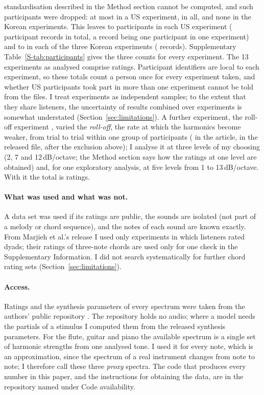 \documentclass[11pt,a4paper]{article}
\begin{document}
standardisation described in the Method section cannot be computed, and such participants
were dropped: at most \nDropUSMax{} in a US experiment, \nDropUSTotal{} in all, and none in
the Korean experiments. This leaves \nUSPerExpMin{} to \nUSPerExpMax{} participants in each
US experiment (\nUSListeners{} participant records in total, a record being one participant
in one experiment) and \nKRPerExpMin{} to \nKRPerExpMax{} in each of the three Korean
experiments (\nKRListeners{} records). Supplementary Table~\ref{S-tab:participants} gives the
three counts for every experiment. The 13 experiments as analysed comprise \nAllTrials{}
ratings. Participant identifiers
are local to each experiment, so these totals count a person once for every experiment taken,
and whether US participants took part in more than one experiment cannot be told from the
files. I treat experiments as independent
samples; to the extent that they share listeners, the uncertainty of results combined over
experiments is somewhat understated (Section~\ref{sec:limitations}). A further experiment, the roll-off experiment
\citep[Study 3 in the numbering of][]{marjieh2024},
varied the \emph{roll-off}, the rate at which the harmonics become
weaker, from trial to trial within one group of participants (\nArtRoll{} in the article,
\nRelRoll{} in the released file, \nRoll{} after the exclusion above); I analyse it at
three levels of my choosing (2, 7 and 12\,dB/octave; the Method section says how the
ratings at one level are obtained) and, for one exploratory analysis, at five
levels from 1 to 13\,dB/octave.
With it the total is \nTrialsTotal{} ratings.

\paragraph{What was used and what was not.}
A data set was used if its ratings are public, the sounds are isolated (not part of a
melody or chord sequence), and the notes of each sound are known exactly. From Marjieh et
al.'s release I used only experiments in which listeners rated dyads; their ratings of
three-note chords are used only for one check in the Supplementary Information. I did not search systematically for further
chord rating sets (Section~\ref{sec:limitations}).

\paragraph{Access.}
Ratings and the synthesis parameters of every spectrum were taken from the authors' public
repository \citep{marjieh2024code}. The repository holds no audio; where a model needs the
partials of a stimulus I computed them from the released synthesis parameters. For the flute,
guitar and piano the available spectrum is a single set of harmonic strengths from one
analysed tone. I used it for every note, which is an approximation, since the spectrum of a
real instrument changes from note to note; I therefore call these three \emph{proxy} spectra. The code that produces every number in this
paper, and the instructions for obtaining the data, are in the repository named under Code
availability.
\end{document}
